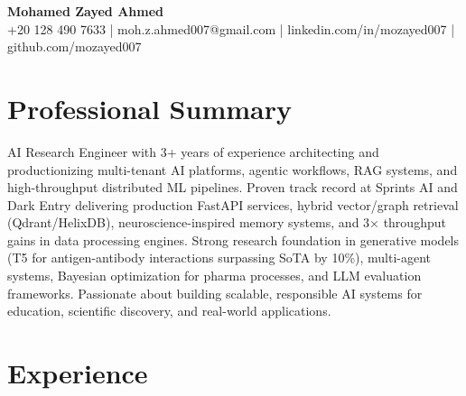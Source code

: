 \documentclass[10pt, letterpaper]{extarticle}
\begin{document}
\begin{center}
    \textbf{\Large Mohamed Zayed Ahmed} \\
    \vspace{3pt}
    \small{+20 128 490 7633 \quad | \quad moh.z.ahmed007@gmail.com \quad | \quad linkedin.com/in/mozayed007 \quad | \quad github.com/mozayed007}
\end{center}

\section{Professional Summary}
AI Research Engineer with 3+ years of experience architecting and productionizing multi-tenant AI platforms, agentic workflows, RAG systems, and high-throughput distributed ML pipelines. Proven track record at Sprints AI and Dark Entry delivering production FastAPI services, hybrid vector/graph retrieval (Qdrant/HelixDB), neuroscience-inspired memory systems, and 3× throughput gains in data processing engines. Strong research foundation in generative models (T5 for antigen-antibody interactions surpassing SoTA by 10\%), multi-agent systems, Bayesian optimization for pharma processes, and LLM evaluation frameworks. Passionate about building scalable, responsible AI systems for education, scientific discovery, and real-world applications.

\section{Experience}
\end{document}
